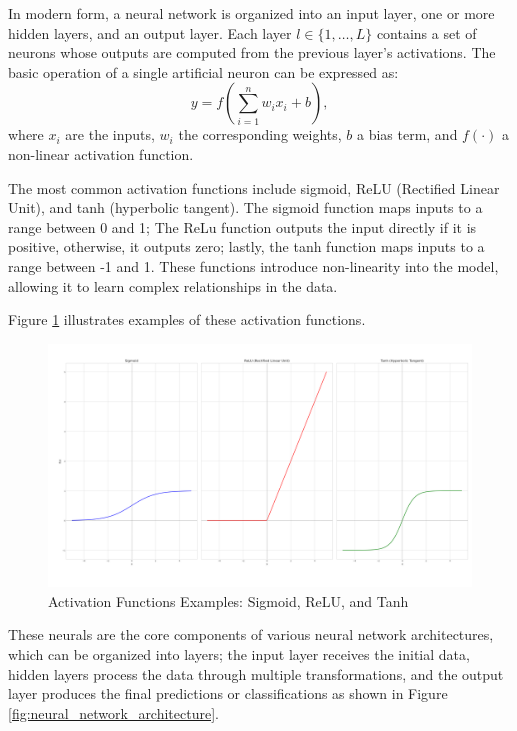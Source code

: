 In modern form, a neural network is organized into an input layer, one or more hidden layers, and an output layer. Each layer $l \in \{1, \dots, L\}$ contains a set of neurons whose outputs are computed from the previous layer's activations. The basic operation of a single artificial neuron can be expressed as:
\begin{equation}
    y = f\left( \sum_{i=1}^{n} w_i x_i + b \right),
    \end{equation}
where $x_i$ are the inputs, $w_i$ the corresponding weights, $b$ a bias term, and $f(\cdot)$ a non-linear activation function. 



The most common activation functions include sigmoid, ReLU (Rectified Linear Unit), and tanh (hyperbolic tangent). The sigmoid function maps inputs to a range between 0 and 1; The ReLu function outputs the input directly if it is positive, otherwise, it outputs zero; lastly, the tanh function maps inputs to a range between -1 and 1. These functions introduce non-linearity into the model, allowing it to learn complex relationships in the data.

Figure \ref{fig:activation_function} illustrates examples of these activation functions.

\newpage
\begin{figure}
    \centering
    \includegraphics[width=1\textwidth]{figuras/2-fundamentos/activationFunctions.png}
    \caption{Activation Functions Examples: Sigmoid, ReLU, and Tanh}
    \label{fig:activation_function}
    \end{figure}

    These neurals are the core components of various neural network architectures, which can be organized into layers; the input layer receives the initial data, hidden layers process the data through multiple transformations, and the output layer produces the final predictions or classifications as shown in Figure \ref{fig:neural_network_architecture}. 
    
